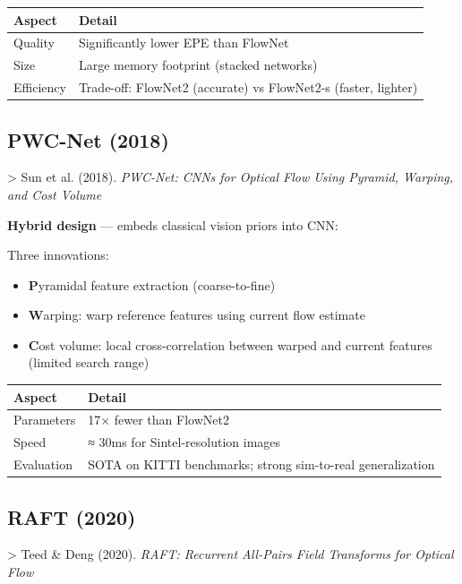 \begin{center}
\begin{tabular}{|l|l|}
\hline
\textbf{Aspect} & \textbf{Detail} \\ \hline
Quality & Significantly lower EPE than FlowNet \\ \hline
Size & Large memory footprint (stacked networks) \\ \hline
Efficiency & Trade-off: FlowNet2 (accurate) vs FlowNet2-s (faster, lighter) \\ \hline
\end{tabular}
\end{center}

\subsection{PWC-Net (2018)}

\textgreater{} Sun et al. (2018). \textit{PWC-Net: CNNs for Optical Flow Using Pyramid, Warping, and Cost Volume}

\textbf{Hybrid design} — embeds classical vision priors into CNN:

Three innovations:
\begin{itemize}
\item \textbf{P}yramidal feature extraction (coarse-to-fine)
\item \textbf{W}arping: warp reference features using current flow estimate
\item \textbf{C}ost volume: local cross-correlation between warped and current features (limited search range)
\end{itemize}

\begin{center}
\begin{tabular}{|l|l|}
\hline
\textbf{Aspect} & \textbf{Detail} \\ \hline
Parameters & 17× fewer than FlowNet2 \\ \hline
Speed & ≈ 30ms for Sintel-resolution images \\ \hline
Evaluation & SOTA on KITTI benchmarks; strong sim-to-real generalization \\ \hline
\end{tabular}
\end{center}

\subsection{RAFT (2020)}

\textgreater{} Teed \& Deng (2020). \textit{RAFT: Recurrent All-Pairs Field Transforms for Optical Flow}

